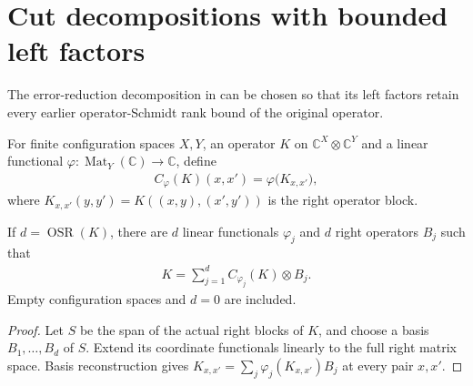 \section{Cut decompositions with bounded left factors}
\label{sec:lvv_cut_decomposition}

The error-reduction decomposition in \cite{Landau2015Polynomial}
can be chosen so that its left factors
retain every earlier operator-Schmidt rank bound of the original operator.

\begin{definition}
    \label{def:lvv_operator_right_contraction}
    \leanok
    For finite configuration spaces $X,Y$, an operator $K$ on
    $\mathbb C^X\otimes\mathbb C^Y$ and a linear functional
    $\varphi:\operatorname{Mat}_Y(\mathbb C)\to\mathbb C$, define
    \begin{align}
        C_\varphi(K)(x,x')=\varphi\bigl(K_{x,x'}\bigr),
    \end{align}
    where $K_{x,x'}(y,y')=K((x,y),(x',y'))$ is the right operator block.
\end{definition}

\begin{lemma}
    \label{thm:lvv_right_contraction_decomposition}
    \leanok
    If $d=\operatorname{OSR}(K)$, there are $d$ linear functionals
    $\varphi_j$ and $d$ right operators $B_j$ such that
    \begin{align}
        K=\sum_{j=1}^d C_{\varphi_j}(K)\otimes B_j.
    \end{align}
    Empty configuration spaces and $d=0$ are included.
\end{lemma}
\begin{proof}
    \leanok
    Let $S$ be the span of the actual right blocks of $K$, and choose a basis
    $B_1,\ldots,B_d$ of $S$. Extend its coordinate functionals linearly to the
    full right matrix space. Basis reconstruction gives
    $K_{x,x'}=\sum_j\varphi_j(K_{x,x'})B_j$ at every pair $x,x'$.
\end{proof}

